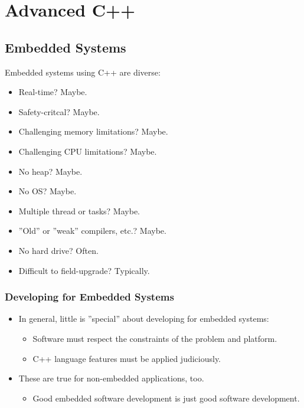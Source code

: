 \section{Advanced C++}

\subsection{Embedded Systems}
Embedded systems using C++ are diverse:
\begin{itemize}
	\item Real-time? Maybe.
	\item Safety-critcal? Maybe.
	\item Challenging memory limitations? Maybe.
	\item Challenging CPU limitations? Maybe.
	\item No heap? Maybe.
	\item No OS? Maybe.
	\item Multiple thread or tasks? Maybe.
	\item ''Old'' or ''weak'' compilers, etc.? Maybe.
	\item No hard drive? Often.
	\item Difficult to field-upgrade? Typically.
\end{itemize}

\subsubsection{Developing for Embedded Systems}
\begin{itemize}
	\item In general, little is ''special'' about developing for embedded systems:
	\begin{itemize}
		\item Software must respect the constraints of the problem and platform.
		\item C++ language features must be applied judiciously.
	\end{itemize}
	\item These are true for non-embedded applications, too.
	\begin{itemize}
		\item Good embedded software development is just good software development.
	\end{itemize}
\end{itemize}

